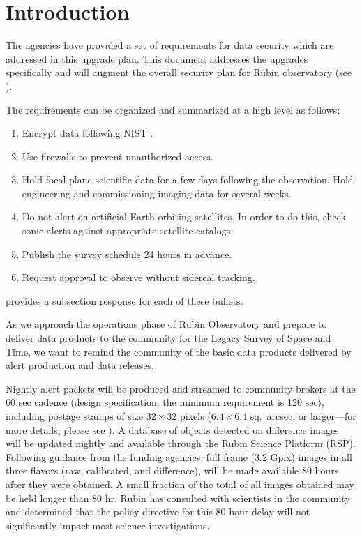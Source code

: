 \section{Introduction}

The agencies have provided a set of requirements for data security which are addressed in this upgrade plan.  This document addresses the upgrades specifically and will augment the overall security plan for Rubin observatory (see ).

The requirements can be organized and summarized at a high level as follows:
\begin{enumerate}

\item	Encrypt data following \gls{NIST} .
\item	Use firewalls to prevent unauthorized  access.
\item	Hold focal plane scientific data for a few days following the observation. Hold engineering and commissioning imaging data for several weeks.
\item	Do not alert on artificial Earth-orbiting satellites.
In order to do this, check some alerts against appropriate satellite catalogs.
\item	Publish the survey schedule 24 hours in advance.
\item	Request approval to observe without sidereal tracking.

\end{enumerate}

 provides a subsection response for each of these bullets.

As we approach the operations phase of Rubin Observatory and prepare to deliver data products to the community for the Legacy Survey of Space and Time, we want to remind the community of the basic data products delivered by alert production and data releases.

Nightly alert packets will be produced and streamed to community brokers at the 60 sec cadence (design specification, the minimum requirement is 120 sec), including postage stamps of size $32 \times 32$ pixels ($6.4 \times 6.4$ sq.\ arcsec, or larger---for more details, please see ). 
A database of objects detected on difference images will be updated nightly and available through the Rubin Science Platform (RSP). 
Following guidance from the funding agencies, full frame (3.2 Gpix) images in all three flavors (raw, calibrated, and difference), will be made available 80 hours after they were obtained.
A small fraction of the total of all images obtained may be held longer than 80 hr. 
Rubin has consulted with scientists in the community and determined that the policy directive for this 80 hour delay will not significantly impact most science investigations.

